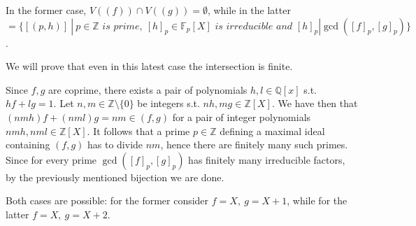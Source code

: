 \documentclass{article}
\newcommand{\numberset}{\mathbb}
\newcommand{\Z}{\numberset{Z}}
\newcommand{\Q}{\numberset{Q}}
\newcommand{\F}{\numberset{F}}
\begin{document}
In the former case, $V((f))\cap V((g))=\emptyset$, while in the latter
$=\{[(p,h)]\ |\ p\in\Z\textit{ is prime},\ [h]_p\in\F_p[X]\textit{ is irreducible}
\textit{ and }[h]_p|\gcd([f]_p,[g]_p)\}$.

We will prove that even in this latest case the intersection is finite.

Since $f,g$ are coprime, there exists a pair of polynomials $h,l\in\Q[x]$
s.t. $hf+lg=1$. Let $n,m\in\Z\setminus\{0\}$
be integers s.t. $nh,mg\in\Z[X]$. We have then that
$(nmh)f+(nml)g=nm\in (f,g)$ for a pair of integer polynomials
$nmh,nml\in\Z[X]$. It follows that a prime $p\in\Z$ defining a maximal ideal
containing $(f,g)$ has to divide $nm$, hence there are finitely many such
primes. Since for every prime $\gcd([f]_p,[g]_p)$ has finitely many irreducible
factors, by the previously mentioned bijection we are done.

Both cases are possible: for the former consider $f=X,\ g=X+1$, while for
the latter $f=X,\ g=X+2$.


\printbibliography
\end{document}
